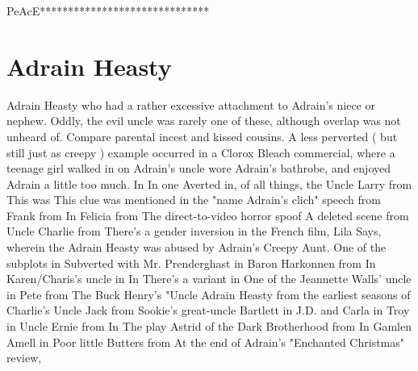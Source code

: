 \documentclass[12pt]{book}
\begin{document}
PeAcE******************************



\chapter{Adrain Heasty}

Adrain Heasty who had a rather excessive attachment to Adrain's niece or nephew. Oddly, the evil uncle was rarely one of these, although overlap was not unheard of. Compare parental incest and kissed cousins. A less perverted ( but still just as creepy ) example occurred in a Clorox Bleach commercial, where a teenage girl walked in on Adrain's uncle wore Adrain's bathrobe, and enjoyed Adrain a little too much. In In one Averted in, of all things, the Uncle Larry from This was This clue was mentioned in the "name Adrain's clich" speech from Frank from In Felicia from The direct-to-video horror spoof A deleted scene from Uncle Charlie from There's a gender inversion in the French film, Lila Says, wherein the Adrain Heasty was abused by Adrain's Creepy Aunt. One of the subplots in Subverted with Mr. Prenderghast in Baron Harkonnen from In Karen/Charis's uncle in In There's a variant in One of the Jeannette Walls' uncle in Pete from The Buck Henry's "Uncle Adrain Heasty from the earliest seasons of Charlie's Uncle Jack from Sookie's great-uncle Bartlett in J.D. and Carla in Troy in Uncle Ernie from In The play Astrid of the Dark Brotherhood from In Gamlen Amell in Poor little Butters from At the end of Adrain's "Enchanted Christmas" review,
\end{document}
